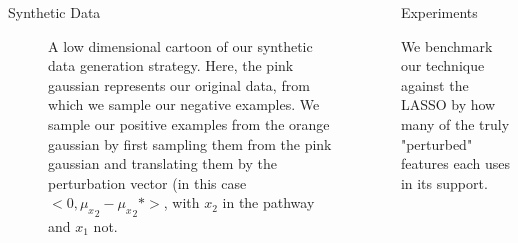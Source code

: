 \documentclass[svgnames,final]{beamer}
\begin{document}
\begin{frame}
\begin{columns}[T]
\begin{column}{.3\linewidth}
\begin{block}{Synthetic Data}
\begin{figure}[h]
		\caption{A low dimensional cartoon of our synthetic data generation strategy. Here, the pink gaussian represents our original data, from which we sample our negative examples. We sample our positive examples from the orange gaussian by first sampling them from the pink gaussian and translating them by the perturbation vector (in this case $<0, {\mu_x}_2 - {\mu_x}_2 *>$, with $x_2$ in the pathway and $x_1$ not.}
		\end{figure}





	\end{block}

\end{column}

\begin{column}{.3\linewidth}

	\begin{block}{Experiments}

		We benchmark our technique against the LASSO by how many of the truly "perturbed" features each uses in its support.


\end{block}
\end{column}
\end{columns}
\end{frame}
\end{document}
